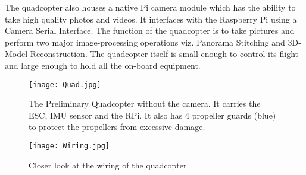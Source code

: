 \newline
\newline
The quadcopter also houses a native Pi camera module which has the ability to take high quality photos and videos. It interfaces with the Raspberry Pi using a Camera Serial Interface. 
\newline
\newline
The function of the quadcopter is to take pictures and perform two major image-processing operations viz. Panorama Stitching and 3D-Model Reconstruction.
The quadcopter itself is small enough to control its flight and large enough to hold all the on-board equipment.
\begin{figure}[H]
  \centering
  \texttt{[image: Quad.jpg]}
  \caption{The Preliminary Quadcopter without the camera. It carries the ESC, IMU sensor and the RPi. It also has 4 propeller guards (blue) to protect the propellers from excessive damage. }
  \label{first quadcopter}	
\end{figure}

\begin{figure}[H]
  \centering
  \texttt{[image: Wiring.jpg]}
  \caption{Closer look at the wiring of the quadcopter}
  \label{second quadcopter}	
\end{figure}


